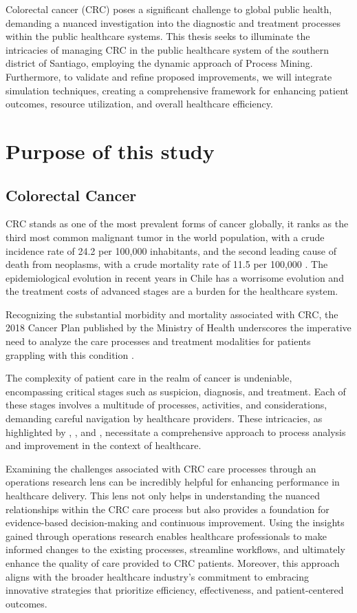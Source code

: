 Colorectal cancer (CRC) poses a significant challenge to global public health, demanding a nuanced investigation into the diagnostic and treatment processes within the public healthcare systems. This thesis seeks to illuminate the intricacies of managing CRC in the public healthcare system of the southern district of Santiago, employing the dynamic approach of Process Mining. Furthermore, to validate and refine proposed improvements, we will integrate simulation techniques, creating a comprehensive framework for enhancing patient outcomes, resource utilization, and overall healthcare efficiency.

\section{Purpose of this study}
\subsection*{Colorectal Cancer}
CRC stands as one of the most prevalent forms of cancer globally, it ranks as the third most common malignant tumor in the world population, with a crude incidence rate of 24.2 per 100,000 inhabitants, and the second leading cause of death from neoplasms, with a crude mortality rate of 11.5 per 100,000 \cite{rios_situacion_2020}. The epidemiological evolution in recent years in Chile has a worrisome evolution and the treatment costs of advanced stages are a burden for the healthcare system.

Recognizing the substantial morbidity and mortality associated with CRC, the 2018 Cancer Plan published by the Ministry of Health underscores the imperative need to analyze the care processes and treatment modalities for patients grappling with this condition \cite{villalobos_dintrans_nuevos_2020}.

The complexity of patient care in the realm of cancer is undeniable, encompassing critical stages such as suspicion, diagnosis, and treatment. Each of these stages involves a multitude of processes, activities, and considerations, demanding careful navigation by healthcare providers. These intricacies, as highlighted by , , and , necessitate a comprehensive approach to process analysis and improvement in the context of healthcare.

Examining the challenges associated with CRC care processes through an operations research lens can be incredibly helpful for enhancing performance in healthcare delivery. This lens not only helps in understanding the nuanced relationships within the CRC care process but also provides a foundation for evidence-based decision-making and continuous improvement. Using the insights gained through operations research enables healthcare professionals to make informed changes to the existing processes, streamline workflows, and ultimately enhance the quality of care provided to CRC patients. Moreover, this approach aligns with the broader healthcare industry's commitment to embracing innovative strategies that prioritize efficiency, effectiveness, and patient-centered outcomes.

